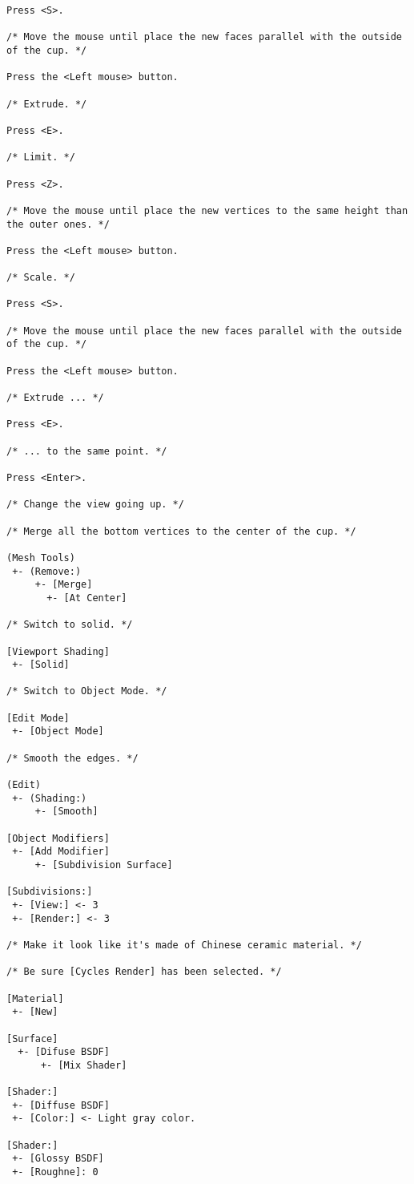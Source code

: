 \begin{verbatim}
Press <S>.

/* Move the mouse until place the new faces parallel with the outside
of the cup. */

Press the <Left mouse> button.

/* Extrude. */

Press <E>.

/* Limit. */

Press <Z>.

/* Move the mouse until place the new vertices to the same height than
the outer ones. */

Press the <Left mouse> button.

/* Scale. */

Press <S>.

/* Move the mouse until place the new faces parallel with the outside
of the cup. */

Press the <Left mouse> button.

/* Extrude ... */

Press <E>.

/* ... to the same point. */

Press <Enter>.

/* Change the view going up. */

/* Merge all the bottom vertices to the center of the cup. */

(Mesh Tools)
 +- (Remove:)
     +- [Merge]
       +- [At Center]

/* Switch to solid. */

[Viewport Shading]
 +- [Solid]

/* Switch to Object Mode. */

[Edit Mode]
 +- [Object Mode]

/* Smooth the edges. */

(Edit)
 +- (Shading:)
     +- [Smooth]

[Object Modifiers]
 +- [Add Modifier]
     +- [Subdivision Surface]

[Subdivisions:]
 +- [View:] <- 3
 +- [Render:] <- 3

/* Make it look like it's made of Chinese ceramic material. */

/* Be sure [Cycles Render] has been selected. */

[Material]
 +- [New]

[Surface]
  +- [Difuse BSDF]
      +- [Mix Shader]

[Shader:]
 +- [Diffuse BSDF]
 +- [Color:] <- Light gray color.

[Shader:]
 +- [Glossy BSDF]
 +- [Roughne]: 0


\end{verbatim}
